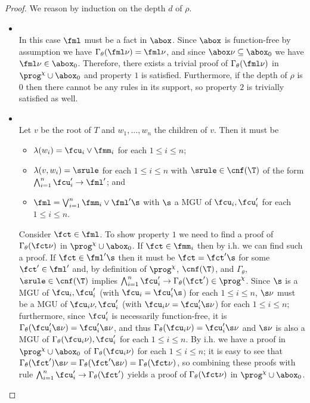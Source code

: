 \begin{proof}
We reason by induction on the depth $d$ of $\rho$.
\begin{itemize}
\item [$d=0$]\ \\
In this case $\fml$ must be a fact in $\abox$. Since $\abox$ is function-free by assumption 
we have $\Gamma_{\theta}(\fml\nu) = \fml\nu$, and since $\abox\nu\subseteq \abox_0$
we have $\fml\nu\in\abox_0$. Therefore, there exists a trivial proof of $\Gamma_{\theta}(\fml\nu)$ 
in $\prog^{\chi}\cup\abox_0$ and property $1$ is satisfied. Furthermore, if the depth 
of $\rho$ is $0$ then there cannot be any rules in its support, so property $2$ is 
trivially satisfied as well. 

\item [$d>0$]\ \\
Let $v$ be the root of $T$ and $w_1,\dots,w_n$ the children of $v$. 
Then it must be
\begin{itemize}
\item $\lambda(w_i) = \fcu_i \vee \fmm_i$ for each $1\leq i \leq n$;
\item $\lambda(v,w_i) = \srule$ for each $1\leq i \leq n$ with
$\srule \in \cnf(\T)$ of the form $\bigwedge_{i=1}^n \fcu'_i\to \fml'$; and
\item $\fml = \bigvee_{i=1}^n\fmm_i\vee\fml'\s$ with $\s$ a MGU of $\fcu_i, \fcu'_i$ for each $1\leq i \leq n$.
\end{itemize}
Consider $\fct\in\fml$. To show property $1$ we need to find
a proof of $\Gamma_{\theta}(\fct\nu)$ in $\prog^{\chi}\cup\abox_0$. 
If $\fct\in\fmm_i$ then by i.h. we can find such a proof.
If  $\fct\in\fml'\s$ then it must be $\fct = \fct'\s$ for some $\fct'\in\fml'$ and, 
by definition of $\prog^{\chi}$, $\cnf(\T)$, and $\Gamma_{\theta}$, $\srule \in \cnf(\T)$ implies 
$\bigwedge_{i=1}^n \fcu'_i\to \Gamma_{\theta}(\fct')\in\prog^{\chi}$.
Since $\s$ is a MGU of $\fcu_i, \fcu'_i$ (with $\fcu_i = \fcu'_i\s$) for each $1\leq i \leq n$, 
$\s\nu$ must be a MGU of $\fcu_i\nu, \fcu'_i$ (with $\fcu_i\nu = \fcu'_i\s\nu$) for each $1\leq i \leq n$;
furthermore, since $\fcu'_i$ is necessarily function-free, 
it is $\Gamma_{\theta}(\fcu'_i\s\nu) = \fcu'_i\s\nu$, 
and thus $\Gamma_{\theta}(\fcu_i\nu) = \fcu'_i\s\nu$ and
$\s\nu$ is also a MGU of $\Gamma_{\theta}(\fcu_i\nu), \fcu'_i$ for each $1\leq i \leq n$.
By i.h. we have a proof in $\prog^{\chi}\cup\abox_0$ of $\Gamma_{\theta}(\fcu_i\nu)$ 
for each $1\leq i \leq n$;
it is easy to see that 
$\Gamma_{\theta}(\fct')\s\nu = \Gamma_{\theta}(\fct'\s\nu) = \Gamma_{\theta}(\fct\nu)$,
so combining these proofs with rule 
$\bigwedge_{i=1}^n \fcu'_i\to \Gamma_{\theta}(\fct')$ yields a proof of
$\Gamma_{\theta}(\fct\nu)$ in $\prog^{\chi}\cup\abox_0$.


\end{itemize}
\end{proof}
